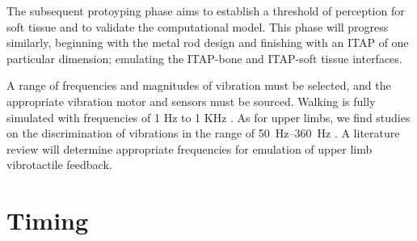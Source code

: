 The subsequent protoyping phase aims to establish a threshold of perception for soft tissue and to validate the computational model.
This phase will progress similarly, beginning with the metal rod design and finishing with an ITAP of one particular dimension; emulating the ITAP-bone and ITAP-soft tissue interfaces.

A range of frequencies and magnitudes of vibration must be selected, and the appropriate vibration motor and sensors must be sourced.
Walking is fully simulated with frequencies of 1 Hz to 1 KHz \cite{antonsson_frequency_1985}.
As for upper limbs, we find studies on the discrimination of vibrations in the range of \SIrange{50}{360}{Hz} \cite{rosenbaum-chou_development_2016}.  
A literature review will determine appropriate frequencies for emulation of upper limb vibrotactile feedback.
\clearpage
\section{Timing}

